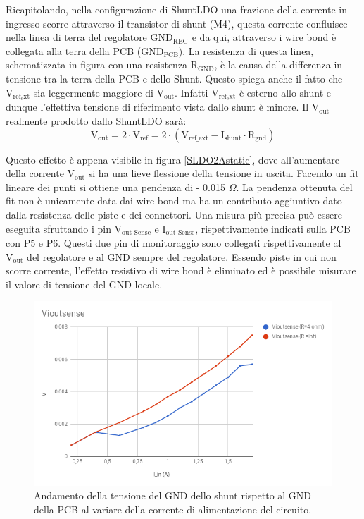 Ricapitolando, nella configurazione di ShuntLDO una frazione della corrente in ingresso scorre attraverso il transistor di shunt (M4), questa corrente confluisce nella linea di terra del regolatore $\mathrm{GND_{REG}}$ e da qui, attraverso i wire bond è collegata alla terra della PCB ($\mathrm{GND_{PCB}}$). La resistenza di questa linea, schematizzata in figura con una resistenza $\mathrm{R_{GND}}$, è la causa della differenza in tensione tra la terra della PCB e dello Shunt. Questo spiega anche il fatto che $\mathrm{V_{ref_ext}}$ sia leggermente maggiore di $\mathrm{V_{out}}$. Infatti  $\mathrm{V_{ref_ext}}$ è esterno allo shunt e dunque l'effettiva tensione di riferimento vista dallo shunt è minore. Il $\mathrm{V_{out}}$ realmente prodotto dallo ShuntLDO sarà:
\begin{equation}
\mathrm{V_{out} = 2 \cdot V_{ref} = 2 \cdot ( V_{ref {\_} ext} - I_{shunt} \cdot R_{gnd} )}
\end{equation}

Questo effetto è appena visibile in figura \ref{SLDO2Astatic}, dove all'aumentare della corrente $\mathrm{V_{out}}$ si ha una lieve flessione della tensione in uscita. Facendo un fit lineare dei punti si ottiene una pendenza di - 0.015 $\Omega$. 
La pendenza ottenuta del fit non è unicamente data dai wire bond ma ha un contributo aggiuntivo dato dalla resistenza delle piste e dei connettori. 
Una misura più precisa può essere eseguita sfruttando i pin $\mathrm{V_{out{\_}Sense}}$ e $\mathrm{I_{out {\_} Sense}}$, rispettivamente indicati sulla PCB con P5 e P6. 
Questi due pin di monitoraggio sono collegati rispettivamente al $\mathrm{V_{out}}$ del regolatore e al GND sempre del regolatore. 
Essendo piste in cui non scorre corrente, l'effetto resistivo di wire bond è eliminato ed è possibile misurare il valore di tensione del GND locale.

\begin{figure}
\centering
\includegraphics[scale=.4]{Immagini/Viout}
\caption{Andamento della tensione del GND dello shunt rispetto al GND della PCB al variare della corrente di alimentazione del circuito.}
\label{VioutSense}
\end{figure}

